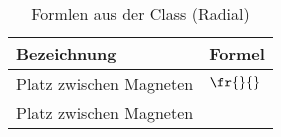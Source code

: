 \begin{table}[h!]

\centering
\caption{Formlen aus der Class (Radial)}
\label{tab:class.rad}
\renewcommand{\arraystretch}{2}
\setlength{\tabcolsep}{10mm}

\begin{tabular}{ll}
    \toprule
     Bezeichnung & Formel\\
    \midrule
	Platz zwischen Magneten&$\fr{}{}$\\
	Platz zwischen Magneten&$\frac{}{}$\\
	
    \bottomrule
  \end{tabular}
\end{table}
